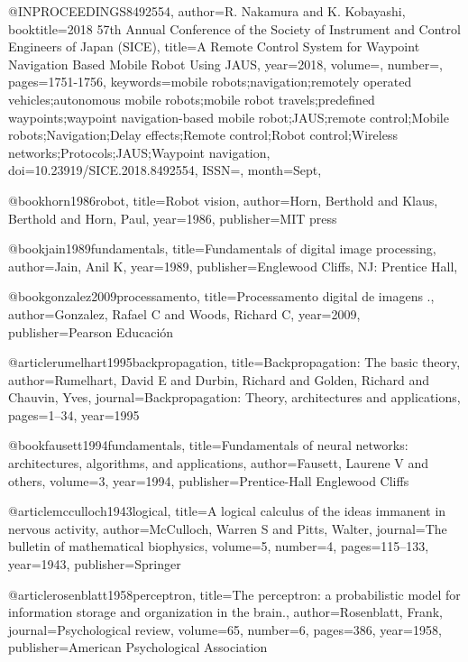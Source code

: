 @INPROCEEDINGS{8492554, 
author={R. Nakamura and K. Kobayashi}, 
booktitle={2018 57th Annual Conference of the Society of Instrument and Control Engineers of Japan (SICE)}, 
title={A Remote Control System for Waypoint Navigation Based Mobile Robot Using JAUS}, 
year={2018}, 
volume={}, 
number={}, 
pages={1751-1756}, 
keywords={mobile robots;navigation;remotely operated vehicles;autonomous mobile robots;mobile robot travels;predefined waypoints;waypoint navigation-based mobile robot;JAUS;remote control;Mobile robots;Navigation;Delay effects;Remote control;Robot control;Wireless networks;Protocols;JAUS;Waypoint navigation}, 
doi={10.23919/SICE.2018.8492554}, 
ISSN={}, 
month={Sept},}

@book{horn1986robot,
  title={Robot vision},
  author={Horn, Berthold and Klaus, Berthold and Horn, Paul},
  year={1986},
  publisher={MIT press}
}

@book{jain1989fundamentals,
  title={Fundamentals of digital image processing},
  author={Jain, Anil K},
  year={1989},
  publisher={Englewood Cliffs, NJ: Prentice Hall,}
}

@book{gonzalez2009processamento,
  title={Processamento digital de imagens .},
  author={Gonzalez, Rafael C and Woods, Richard C},
  year={2009},
  publisher={Pearson Educaci{\'o}n}
}

@article{rumelhart1995backpropagation,
  title={Backpropagation: The basic theory},
  author={Rumelhart, David E and Durbin, Richard and Golden, Richard and Chauvin, Yves},
  journal={Backpropagation: Theory, architectures and applications},
  pages={1--34},
  year={1995}
}

@book{fausett1994fundamentals,
  title={Fundamentals of neural networks: architectures, algorithms, and applications},
  author={Fausett, Laurene V and others},
  volume={3},
  year={1994},
  publisher={Prentice-Hall Englewood Cliffs}
}

@article{mcculloch1943logical,
  title={A logical calculus of the ideas immanent in nervous activity},
  author={McCulloch, Warren S and Pitts, Walter},
  journal={The bulletin of mathematical biophysics},
  volume={5},
  number={4},
  pages={115--133},
  year={1943},
  publisher={Springer}
}

@article{rosenblatt1958perceptron,
  title={The perceptron: a probabilistic model for information storage and organization in the brain.},
  author={Rosenblatt, Frank},
  journal={Psychological review},
  volume={65},
  number={6},
  pages={386},
  year={1958},
  publisher={American Psychological Association}
}

